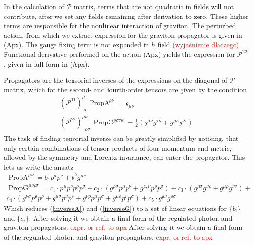 \documentclass[11pt, a4paper]{article}
\begin{document}
In the calculation of $\mathcal{P}$ matrix, terms that are not quadratic in fields will not contribute, after we set any fields remaining after derivation to zero.
These higher terms are responsible for the nonlinear interaction of graviton. The perturbed action, from which we extract expression
for the graviton propagator is given in (Apx). The gauge fixing term is not expanded in $h$ field \textcolor{red}{(wyjaśnienie dlaczego)}
Functional derivative performed on the action (Apx) yields the expression for
$\mathcal{P}^{2 2}$, given in full form in (Apx).

Propagators are the tensorial inverses of the expressions on the diagonal of $\mathcal{P}$ matrix, which for
the second- and fourth-order tensors are given by the condition
\begin{gather}
    \left(\mathcal{P}^{1 1}\right)^{\mu}_{ \; \rho} \ \operatorname{PropA}^{\rho \nu}  = g_{\mu \nu} \label{inverseA}\\
    \left(\mathcal{P}^{2 2}\right)^{\mu\nu}_{ \; \; \rho \sigma} \ \operatorname{PropG}^{\rho \sigma \tau \kappa} = \frac{1}{2} \left( g^{\mu\nu} g^{\tau\kappa} + g^{\mu\kappa} g^{\nu\tau} \right) \label{inverseG}
\end{gather}
The task of finding tensorial inverse can be greatly simplified by noticing, that only certain combinations of tensor
products of four-momentum and metric, allowed by the symmetry and Lorentz invariance, can enter the propagator.
This lets us write the ansatz
\begin{gather}
    \operatorname{PropA}^{\mu \nu} = b_1 p^{\mu} p^{\nu} + b^2 g^{\mu\nu}\\
    \operatorname{PropG}^{\mu \nu \rho \sigma} =
    c_1 \cdot p^{\mu} p^{\nu}
   p^{\rho} p^{\sigma} + c_2 \cdot
   (g^{\rho \sigma} p^{\mu}
   p^{\nu} + g^{\mu,\nu}
   p^{\rho} p^{\sigma})+c_3 \cdot
   (g^{\mu \sigma} g^{\nu\rho} + g^{\mu \rho}
   g^{\nu\sigma})+ \\ c_4 \cdot (g^{\nu\sigma}
   p^{\mu}
   p^{\rho}+g^{\mu\sigma}
   p^{\nu}
   p^{\rho} +g^{\nu\rho}
   p^{\mu}
   p^{\sigma}+g^{\mu\rho}
   p^{\nu} p^{\sigma})+c_5 \cdot
   g^{\mu \nu} g^{\rho\sigma}
\end{gather}
Which reduces (\ref*{inverseA}) and (\ref*{inverseG}) to a set of linear equations for $\{b_i\}$ and $\{c_i\}$.
After solving it we obtain a final form of the regulated photon and graviton propagators. \textcolor{red}{expr. or ref. to apx}
After solving it we obtain a final form of the regulated photon and graviton propagators. \textcolor{red}{expr. or ref. to apx}
\end{document}
